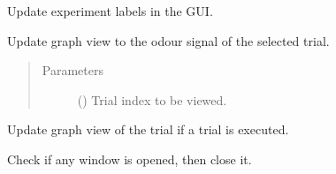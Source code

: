 \documentclass[letterpaper,10pt,english]{sphinxmanual}
\begin{document}
\begin{fulllineitems}

\begin{fulllineitems}
\label{\detokenize{NoSeMazeController/main:main.MainApp.update_experiment_info}}
\pysigstartsignatures
{}
\pysigstopsignatures
\sphinxAtStartPar
Update experiment labels in the GUI.

\end{fulllineitems}


\begin{fulllineitems}
\label{\detokenize{NoSeMazeController/main:main.MainApp.update_graphics_view}}
\pysigstartsignatures
{}
\pysigstopsignatures
\sphinxAtStartPar
Update graph view to the odour signal of the selected trial.
\begin{quote}\begin{description}
\item[{Parameters}] \leavevmode
\sphinxAtStartPar
{} () \textendash{} Trial index to be viewed.

\end{description}\end{quote}

\end{fulllineitems}


\begin{fulllineitems}
\label{\detokenize{NoSeMazeController/main:main.MainApp.update_trial_view}}
\pysigstartsignatures
{}
\pysigstopsignatures
\sphinxAtStartPar
Update graph view of the trial if a trial is executed.

\end{fulllineitems}


\begin{fulllineitems}
\label{\detokenize{NoSeMazeController/main:main.MainApp.windows_control}}
\pysigstartsignatures
{}
\pysigstopsignatures
\sphinxAtStartPar
Check if any window is opened, then close it.

\end{fulllineitems}


\end{fulllineitems}
\end{document}
